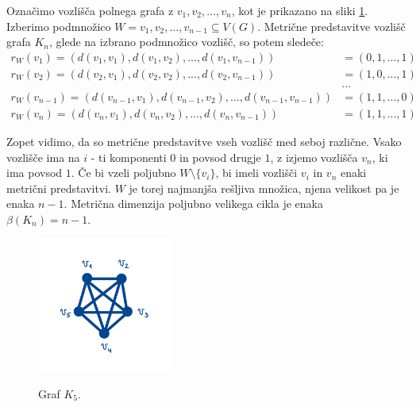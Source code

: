 \documentclass[mat1, tisk]{fmfdelo}
\begin{document}
\begin{primer}\label{primer_2.6.}
    Označimo vozlišča polnega grafa z $v_1, v_2, ..., v_n$, kot je prikazano na sliki \ref{fig:polni}. 
    Izberimo podmnožico $W = {v_1, v_2, ... , v_{n-1}} \subseteq V(G).$ 
    Metrične predstavitve vozlišč grafa $K_n$, glede na izbrano podmnožico vozlišč, so potem 
    sledeče:
    \begin{align*}
        r_W(v_1) = (d(v_1, v_1), d(v_1, v_2), ... , d(v_1, v_{n-1})) & = (0, 1, ... , 1) \\
        r_W(v_2) = (d(v_2, v_1), d(v_2, v_2), ... , d(v_2, v_{n-1})) & = (1, 0, ... , 1) \\
        & \dots \\
        r_W(v_{n-1}) = (d(v_{n-1}, v_1), d(v_{n-1}, v_2), ... , d(v_{n-1}, v_{n-1})) & = (1, 1, ... , 0) \\
        r_W(v_n) = (d(v_n, v_1), d(v_n, v_2), ... ,  d(v_n, v_{n-1})) & = (1, 1, ... , 1)
    \end{align*}
    
    Zopet vidimo, da so metrične predstavitve vseh vozlišč med seboj različne. Vsako 
    vozlišče ima na $i$ - ti komponenti $0$ in povsod drugje $1$, z izjemo vozlišča $v_n$, 
    ki ima povsod $1$. Če bi vzeli poljubno $W \setminus \{v_i\}$, bi imeli vozlišči $v_i$ 
    in $v_n$ enaki metrični predstavitvi. $W$  je torej najmanjša rešljiva množica, njena 
    velikost pa je enaka $n-1$. Metrična dimenzija poljubno velikega cikla je enaka $\beta(K_n) = n-1.$

    \begin{figure}[h]
        \caption{Graf $K_5$.}
        \centering
        \includegraphics[width=0.4\textwidth]{IMG_polni.jpg}
        \label{fig:polni}
    \end{figure}

\end{primer}


\end{document}
